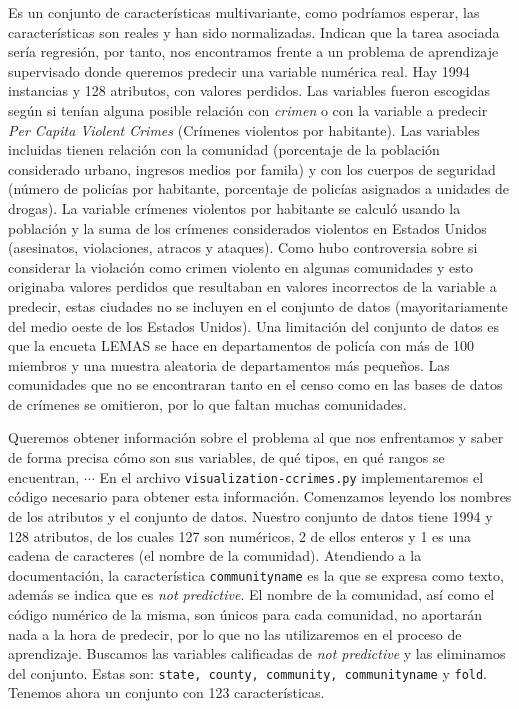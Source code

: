 \documentclass[a4paper, 20pt]{article}
\begin{document}
Es un conjunto de características multivariante, como podríamos esperar, las características son reales y han sido normalizadas. Indican que la tarea asociada sería regresión, por tanto, nos encontramos frente a un problema de aprendizaje supervisado donde queremos predecir una variable numérica real. Hay 1994 instancias y 128 atributos, con valores perdidos. Las variables fueron escogidas según si tenían alguna posible relación con \textit{crimen} o con la variable a predecir \textit{Per Capita Violent Crimes} (Crímenes violentos por habitante). Las variables incluidas tienen relación con la comunidad (porcentaje de la población considerado urbano, ingresos medios por famila) y con los cuerpos de seguridad (número de policías por habitante, porcentaje de policías asignados a unidades de drogas). La variable crímenes violentos por habitante se calculó usando la población y la suma de los crímenes considerados violentos en Estados Unidos (asesinatos, violaciones, atracos y ataques). Como hubo controversia sobre si considerar la violación como crimen violento en algunas comunidades y esto originaba valores perdidos que resultaban en valores incorrectos de la variable a predecir, estas ciudades no se incluyen en el conjunto de datos (mayoritariamente del medio oeste de los Estados Unidos). Una limitación del conjunto de datos es que la encueta LEMAS se hace en departamentos de policía con más de 100 miembros y una muestra aleatoria de departamentos más pequeños. Las comunidades que no se encontraran tanto en el censo como en las bases de datos de crímenes se omitieron, por lo que faltan muchas comunidades.

Queremos obtener información sobre el problema al que nos enfrentamos y saber de forma precisa cómo son sus variables, de qué tipos, en qué rangos se encuentran, $\cdots$ En el archivo \texttt{visualization-ccrimes.py} implementaremos el código necesario para obtener esta información. Comenzamos leyendo los nombres de los atributos y el conjunto de datos. Nuestro conjunto de datos tiene 1994 y 128 atributos, de los cuales 127 son numéricos, 2 de ellos enteros y 1 es una cadena de caracteres (el nombre de la comunidad). Atendiendo a la documentación, la característica \texttt{communityname} es la que se expresa como texto, además se indica que es \textit{not predictive}. El nombre de la comunidad, así como el código numérico de la misma, son únicos para cada comunidad, no aportarán nada a la hora de predecir, por lo que no las utilizaremos en el proceso de aprendizaje. Buscamos las variables calificadas de \textit{not predictive} y las eliminamos del conjunto. Estas son: \texttt{state, county, community, communityname} y \texttt{fold}. Tenemos ahora un conjunto con 123 características.
\end{document}

